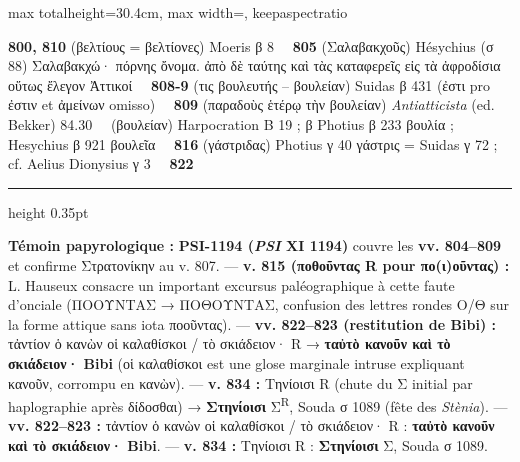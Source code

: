 \documentclass[11pt,twoside]{book}
\newcommand{\currHeadLE}{ΑΡΙΣΤΟΦΑΝΟΥΣ ΘΕΣΜΟΦΟΡΙΑΖΟΥΣΑΙ · SCHOLIES ({\policeGr Σ}\expo{R}) \& GLOSES DU CODEX RAVENNAS 429}
\newcommand{\currHeadRE}{Atlas \& Édition Folio par Folio (ff. 162v–177r)}
\newcommand{\currHeadLO}{ATLAS DES SCHOLIES ({\policeGr Σ}\expo{R}), GLOSES INTERLINÉAIRES \& COLLATION DE R}
\newcommand{\italique}[1]{\textit{#1}}
\newcommand{\expo}[1]{\textsuperscript{#1}}
\newcommand{\PsiUn}{PSI-1194}
\newcommand{\AelDion}{Aelius Dionysius }
\newcommand{\Antiatt}{\textit{Antiatticista} (ed. Bekker) }
\newcommand{\Harp}{Harpocration }
\newcommand{\lecon}[1]{\textbf{#1}}
\newcommand{\espTest}{\ {\color{ruleGold}{\policeFr ∥}}\ }
\begin{document}
\begin{adjustbox}{max totalheight=30.4cm, max width=\textwidth, keepaspectratio}
\begin{minipage}{\textwidth}
{ \textbf{800, 810} (βελτίους = βελτίονες) Moeris β 8 \espTest \textbf{805} (Σαλαβακχοῦς) Hésychius (σ 88) Σαλαβακχώ· πόρνης ὄνομα. ἀπὸ δὲ ταύτης καὶ τὰς καταφερεῖς εἰς τὰ ἀφροδίσια οὕτως ἔλεγον Ἀττικοί \espTest \textbf{808-9} (τις βουλευτής -- βουλείαν) Suidas β 431 (ἐστι pro ἐστιν et ἀμείνων omisso) \espTest \textbf{809} (παραδοὺς ἑτέρῳ τὴν βουλείαν) \Antiatt 84.30 \espTest (βουλείαν) \Harp B 19 ; β Photius β 233 βουλία ; Hesychius β 921 βουλεῖα \espTest \textbf{816} (γάστριδας) Photius γ 40 γάστρις = Suidas γ 72 ; cf. \AelDion γ 3 \espTest \textbf{822} %
{\color{ruleGold}\hrule height 0.35pt}\vspace{2.5pt}
 \textbf{Témoin papyrologique :} \textbf{\PsiUn{} (\italique{PSI} XI 1194)} couvre les \textbf{vv. 804–809} et confirme Στρατονίκην au v. 807. --- \textbf{v. 815 (ποθοῦντας R pour πο(ι)οῦντας) :} L. Hauseux consacre un important excursus paléographique à cette faute d'onciale (ΠΟΟΥΝΤΑΣ {\policeFr →} ΠΟΘΟΥΝΤΑΣ, confusion des lettres rondes Ο/Θ sur la forme attique sans iota ποοῦντας). --- \textbf{vv. 822–823 (restitution de \textbf{Bibi}) :} τἀντίον ὁ κανὼν οἱ καλαθίσκοι / τὸ σκιάδειον· R {\policeFr →} \lecon{ταὐτὸ κανοῦν καὶ τὸ σκιάδειον·} \lecon{Bibi} (οἱ καλαθίσκοι est une glose marginale intruse expliquant κανοῦν, corrompu en κανὼν). --- \textbf{v. 834 :} Τηνίοισι R (chute du {\policeGr Σ} initial par haplographie après δίδοσθαι) {\policeFr →} \lecon{Στηνίοισι} {\policeGr Σ}\expo{R}, Souda σ 1089 (fête des \italique{Stènia}). --- \textbf{vv. 822–823 :} τἀντίον ὁ κανὼν οἱ καλαθίσκοι / τὸ σκιάδειον· R : \lecon{ταὐτὸ κανοῦν καὶ τὸ σκιάδειον·} \lecon{Bibi}. --- \textbf{v. 834 :} Τηνίοισι R : \lecon{Στηνίοισι} {\policeGr Σ}, Souda σ 1089.\par}
\end{minipage}\end{adjustbox}
\newpage
\renewcommand{\currHeadLE}{SCHOLIES MARGINALES ({\policeGr Σ}\expo{R}) \& GLOSES INTERLINÉAIRES · FOLIO 20/30}
\renewcommand{\currHeadRE}{f. 172r (Classense 174r) · vv. 800–837 · {\policeGr Σ} 257 à {\policeGr Σ} 267}
\renewcommand{\currHeadLO}{SCHOLIES MARGINALES ({\policeGr Σ}\expo{R}) \& GLOSES INTERLINÉAIRES · FOLIO 20/30}
\end{document}
